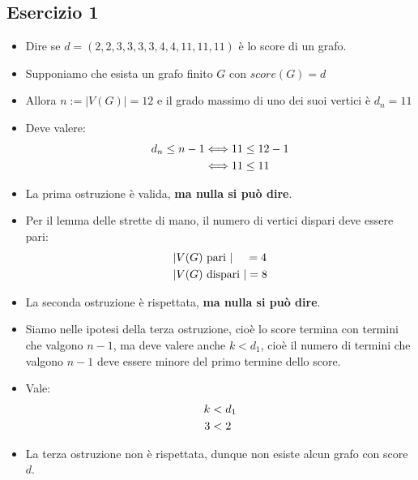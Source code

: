 \documentclass[10pt]{article}
\begin{document}
	\subsection{Esercizio 1}
	\begin{itemize}
	\item
	Dire se $d = (2,2,3,3,3,3,4,4,11,11,11)$ è lo score di un grafo.
	\item
	Supponiamo che esista un grafo finito $G$ con $score(G) = d$
	\item
	Allora $n := |V(G)| = 12$ e il grado massimo di uno dei suoi vertici è $d_n = 11$
	\item
	Deve valere:
	\begin{equation}
	\begin{split}
		d_n \leq n - 1 &\Longleftrightarrow 11 \leq 12 - 1  \\
		&\Longleftrightarrow 11 \leq 11
		\notag
		\end{split}
	\end{equation}
	\item
	La prima ostruzione è valida, \textbf{ma nulla si può dire}.
	\item
	Per il lemma delle strette di mano, il numero di vertici dispari deve essere pari:
	\begin{equation}
	\begin{split}
		|&V(G) \textrm{ pari }| \quad\, =  4\\
		|&V(G) \textrm{ dispari }| = 8 
		\notag
		\end{split}
	\end{equation}
	\item
	La seconda ostruzione è rispettata, \textbf{ma nulla si può dire}.
	\item
	Siamo nelle ipotesi della terza ostruzione, cioè lo score termina con termini che valgono $n-1$, ma deve valere anche $k < d_1$, cioè il numero di termini che valgono $n-1$ deve essere minore del primo termine dello score.
	\item
	Vale:
	\begin{equation}
	\begin{split}
		k &< d_1 \\
		3 &< 2
		\notag
		\end{split}
	\end{equation}
	\item
	La terza ostruzione non è rispettata, dunque non esiste alcun grafo con score $d$.
	\end{itemize}
	
\end{document}
